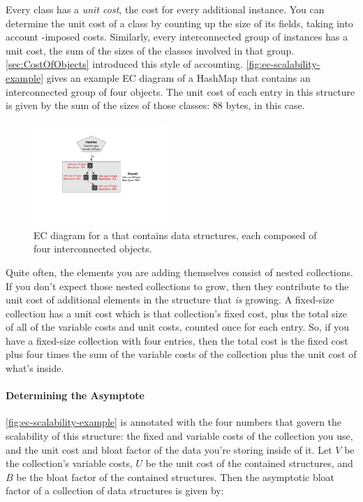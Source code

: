 Every class has a \emph{unit cost}, the cost for every additional instance. You
can determine the unit cost of a class by counting up the size of its fields,
taking into account \jre-imposed costs. Similarly, every interconnected group of
instances has a unit cost, the sum of the sizes of the classes involved in that
group. \autoref{sec:CostOfObjects} introduced this style of accounting.
\autoref{fig:ec-scalability-example} gives an example EC diagram of a HashMap
that contains an interconnected group of four objects. The unit cost of each
entry in this structure is given by the sum of the sizes of those classes: 88
bytes, in this case.
\begin{figure}
\centering
\includegraphics[width=0.45\textwidth]{part3/Figures/assessing/EC-example}
\caption{EC diagram for a  that contains data structures, each
composed of four interconnected objects.}
\label{fig:ec-scalability-example}
\end{figure}

Quite often, the elements you are adding themselves consist of nested
collections. If you don't expect those nested collections to grow, then they
contribute to the unit cost of additional elements in the structure that
\emph{is} growing. A fixed-size collection has a unit cost which is that
collection's fixed cost, plus the total size of all of the variable costs and
unit costs, counted once for each entry. So, if you have a fixed-size collection
with four entries, then the total cost is the fixed cost plus four times the sum
of the variable costs of the collection plus the unit cost of what's inside.


\paragraph{Determining the Asymptote}
\autoref{fig:ec-scalability-example} is annotated with the four numbers that
govern the scalability of this structure: the fixed and variable costs of the
collection you use, and the unit cost and bloat factor of the data you're
storing inside of it. Let $V$ be the collection's variable costs, $U$ be the
unit cost of the contained structures, and $B$ be the bloat factor of the
contained structures. Then the asymptotic bloat factor of a collection of data
structures is given by:

